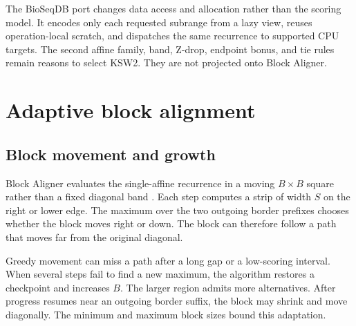 The BioSeqDB port changes data access and allocation rather than the scoring
model. It encodes only each requested subrange from a lazy view, reuses
operation-local scratch, and dispatches the same recurrence to supported CPU
targets. The second affine family, band, Z-drop, endpoint bonus, and tie rules
remain reasons to select KSW2. They are not projected onto Block Aligner.

\section{Adaptive block alignment}
\label{sec:final-alignment-block}

\subsection{Block movement and growth}

Block Aligner evaluates the single-affine recurrence in a moving
\(B\times B\) square rather than a fixed diagonal band
\cite{block_aligner_paper}. Each step computes a strip of width \(S\) on the
right or lower edge. The maximum over the two outgoing border prefixes chooses
whether the block moves right or down. The block can therefore follow a path
that moves far from the original diagonal.

Greedy movement can miss a path after a long gap or a low-scoring interval.
When several steps fail to find a new maximum, the algorithm restores a
checkpoint and increases \(B\). The larger region admits more alternatives.
After progress resumes near an outgoing border suffix, the block may shrink
and move diagonally. The minimum and maximum block sizes bound this adaptation.

